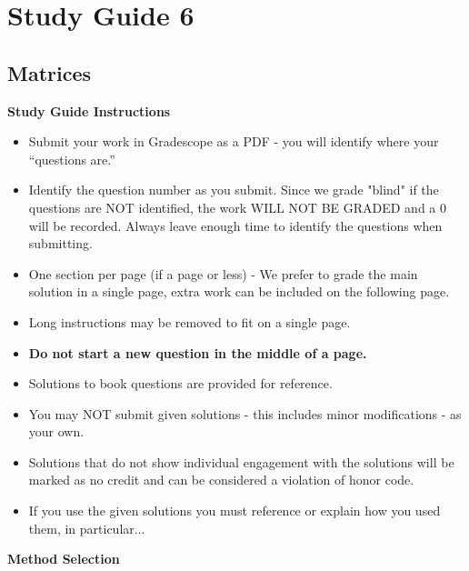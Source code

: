 \clearpage
\chapter{Study Guide 6}

\section{Matrices}

\begin{center}
    \large{\textbf{Study Guide Instructions}}
\end{center}


\begin{itemize}
    \item Submit your work in Gradescope as a PDF - you will identify where your “questions are.”
    \item Identify the question number as you submit.  Since we grade "blind" if the questions are NOT identified, the work WILL NOT BE GRADED and a 0 will be recorded. Always leave enough time to 
    identify the questions when submitting.
    \item One section per page (if a page or less) - We prefer to grade the main solution in a single page, extra work can be included on the following page.
    \item Long instructions may be removed to fit on a single page.
    \item \textbf{Do not start a new question in the middle of a page.}
    \item Solutions to book questions are provided for reference.
    \item You may NOT submit given solutions - this includes minor modifications - as your own.
    \item Solutions that do not show individual engagement with the solutions will be marked as no credit and can be considered a violation of honor code.
    \item If you use the given solutions you must reference or explain how you used them, in particular...
\end{itemize}


\begin{center}
    \large{\textbf{Method Selection}}
\end{center}


